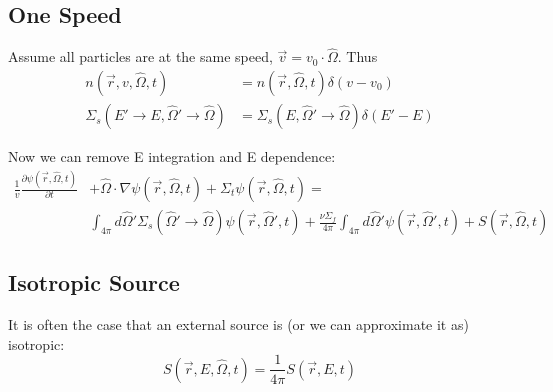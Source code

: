 \documentclass[12pt]{article}
\newcommand{\vOmega}{\ensuremath{\hat{\Omega}}}
\begin{document}
\subsection*{One Speed}
Assume all particles are at the same speed, $\vec{v} = v_0 \cdot \vOmega$. Thus
\begin{align*}
n(\vec{r}, v, \vOmega, t) &= n(\vec{r}, \vOmega, t) \delta(v - v_0) \\
\Sigma_s(E' \rightarrow E, \vOmega' \rightarrow \vOmega) &= \Sigma_s(E, \vOmega' \rightarrow \vOmega)\delta(E' - E)
\end{align*}

Now we can remove E integration and E dependence:
%
\begin{align*}
\frac{1}{v}\frac{\partial \psi(\vec{r}, \vOmega, t)}{\partial t} &+ 
\vOmega \cdot \nabla \psi(\vec{r}, \vOmega, t) +
\Sigma_t \psi(\vec{r}, \vOmega, t) = \nonumber\\
%
& \int_{4\pi} d\vOmega' \Sigma_s(\vOmega' \rightarrow \vOmega) \psi(\vec{r}, \vOmega', t)  
+ \frac{\nu \Sigma_f}{4\pi} \int_{4\pi} d\vOmega' \psi(\vec{r},  \vOmega', t) 
+ S(\vec{r}, \vOmega, t) 
\end{align*}
%

\subsection*{Isotropic Source}
It is often the case that an external source is (or we can approximate it as) isotropic:
\[ S(\vec{r}, E, \vOmega, t) = \frac{1}{4 \pi}  S(\vec{r}, E, t) \]


\end{document}
